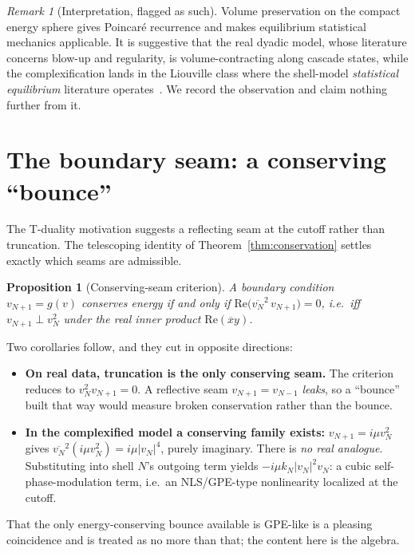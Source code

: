 \documentclass[11pt,a4paper]{article}
\newtheorem{proposition}[theorem]{Proposition}
\theoremstyle{definition}
\theoremstyle{remark}
\newtheorem{remark}[theorem]{Remark}
\newcommand{\conj}[1]{\overline{#1}}
\begin{document}
\begin{remark}[Interpretation, flagged as such]
Volume preservation on the compact energy sphere gives Poincar\'e recurrence and makes
equilibrium statistical mechanics applicable. It is suggestive that the real dyadic model,
whose literature concerns blow-up and regularity, is volume-contracting along cascade
states, while the complexification lands in the Liouville class where the shell-model
\emph{statistical equilibrium} literature operates~\cite{Aurell1994,Ditlevsen1996,%
Thalabard2016,TomRay2017}. We record the observation and claim nothing further from it.
\end{remark}

\section{The boundary seam: a conserving ``bounce''}
\label{sec:seam}

The T-duality motivation suggests a reflecting seam at the cutoff rather than truncation.
The telescoping identity of Theorem~\ref{thm:conservation} settles exactly which seams are
admissible.

\begin{proposition}[Conserving-seam criterion]
\label{prop:seam}
A boundary condition $v_{N+1}=g(v)$ conserves energy if and only if
$\mathrm{Re}\big(\conj{v_N}^2\,v_{N+1}\big) = 0$, i.e.\ iff $v_{N+1}\perp v_N^2$ under the
real inner product $\mathrm{Re}(\conj{x}y)$.
\end{proposition}

Two corollaries follow, and they cut in opposite directions:
\begin{itemize}[leftmargin=1.4em,itemsep=1pt]
  \item \textbf{On real data, truncation is the only conserving seam.} The criterion
  reduces to $v_N^2 v_{N+1}=0$. A reflective seam $v_{N+1}=v_{N-1}$ \emph{leaks}, so a
  ``bounce'' built that way would measure broken conservation rather than the bounce.
  \item \textbf{In the complexified model a conserving family exists:}
  $v_{N+1} = i\mu v_N^2$ gives $\conj{v_N}^2(i\mu v_N^2) = i\mu|v_N|^4$, purely imaginary.
  There is \emph{no real analogue}. Substituting into shell $N$'s outgoing term yields
  $-i\mu k_N |v_N|^2 v_N$: a cubic self-phase-modulation term, i.e.\ an NLS/GPE-type
  nonlinearity localized at the cutoff.
\end{itemize}

That the only energy-conserving bounce available is GPE-like is a pleasing coincidence and
is treated as no more than that; the content here is the algebra.
\end{document}
